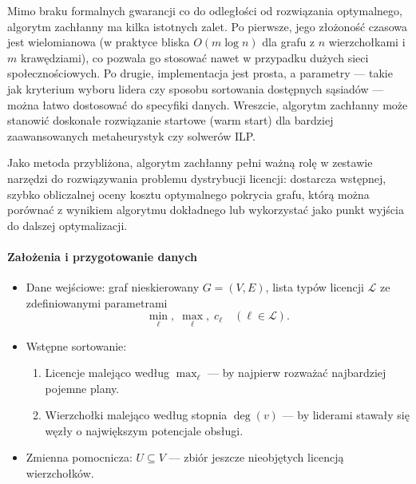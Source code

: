 Mimo braku formalnych gwarancji co do odległości od rozwiązania optymalnego, algorytm zachłanny ma kilka istotnych zalet. Po pierwsze, jego złożoność czasowa jest wielomianowa (w praktyce bliska $O(m\log n)$ dla grafu z $n$ wierzchołkami i $m$ krawędziami), co pozwala go stosować nawet w przypadku dużych sieci społecznościowych. Po drugie, implementacja jest prosta, a parametry — takie jak kryterium wyboru lidera czy sposobu sortowania dostępnych sąsiadów — można łatwo dostosować do specyfiki danych. Wreszcie, algorytm zachłanny może stanowić doskonałe rozwiązanie startowe (warm start) dla bardziej zaawansowanych metaheurystyk czy solwerów ILP.

Jako metoda przybliżona, algorytm zachłanny pełni ważną rolę w zestawie narzędzi do rozwiązywania problemu dystrybucji licencji: dostarcza wstępnej, szybko obliczalnej oceny kosztu optymalnego pokrycia grafu, którą można porównać z wynikiem algorytmu dokładnego lub wykorzystać jako punkt wyjścia do dalszej optymalizacji.

\paragraph{Założenia i przygotowanie danych}
\begin{itemize}
  \item Dane wejściowe: graf nieskierowany $G=(V,E)$, lista typów licencji $\mathcal{L}$ ze zdefiniowanymi parametrami 
    \[
      \min_\ell,\;\max_\ell,\;c_\ell\quad(\ell\in\mathcal{L}).
    \]
  \item Wstępne sortowanie:
    \begin{enumerate}
      \item Licencje malejąco według $\max_\ell$ — by najpierw rozważać najbardziej pojemne plany.
      \item Wierzchołki malejąco według stopnia $\deg(v)$ — by liderami stawały się węzły o największym potencjale obsługi.
    \end{enumerate}
  \item Zmienna pomocnicza: $U\subseteq V$ — zbiór jeszcze nieobjętych licencją wierzchołków.
\end{itemize}

